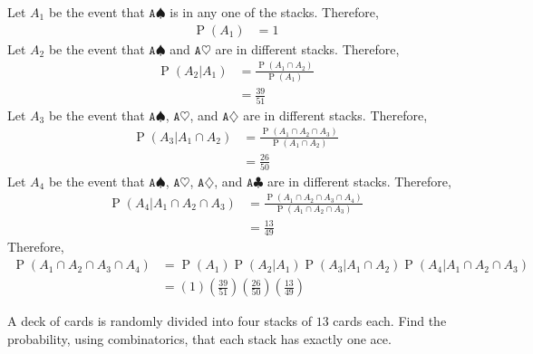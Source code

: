 \documentclass[titlepage, fleqn, a4paper, 12pt, twoside]{article}
\theoremstyle{definition}
\theoremstyle{theorem}
\DeclareMathOperator{\prob}{\mathrm{P}}
\begin{document}
\begin{solution}
	Let $A_1$ be the event that $\mathtt{A}\spadesuit$ is in any one of the stacks.
	Therefore,
	\begin{align*}
		\prob(A_1) & = 1
	\end{align*}
	Let $A_2$ be the event that $\mathtt{A}\spadesuit$ and $\mathtt{A}\heartsuit$ are in different stacks.
	Therefore,
	\begin{align*}
		\prob(A_2 | A_1) & = \frac{\prob(A_1 \cap A_2)}{\prob(A_1)} \\
                                 & = \frac{39}{51}
	\end{align*}
	Let $A_3$ be the event that $\mathtt{A}\spadesuit$, $\mathtt{A}\heartsuit$, and $\mathtt{A}\diamondsuit$ are in different stacks.
	Therefore,
	\begin{align*}
		\prob(A_3 | A_1 \cap A_2) & = \frac{\prob(A_1 \cap A_2 \cap A_3)}{\prob(A_1 \cap A_2)} \\
                                          & = \frac{26}{50}
	\end{align*}
	Let $A_4$ be the event that $\mathtt{A}\spadesuit$, $\mathtt{A}\heartsuit$, $\mathtt{A}\diamondsuit$, and $\mathtt{A}\clubsuit$ are in different stacks.
	Therefore,
	\begin{align*}
		\prob(A_4 | A_1 \cap A_2 \cap A_3) & = \frac{\prob(A_1 \cap A_2 \cap A_3 \cap A_4)}{\prob(A_1 \cap A_2 \cap A_3)} \\
                                                   & = \frac{13}{49}
	\end{align*}
	Therefore,
	\begin{align*}
		\prob(A_1 \cap A_2 \cap A_3 \cap A_4) & = \prob(A_1) \prob(A_2 | A_1) \prob(A_3 | A_1 \cap A_2) \prob(A_4 | A_1 \cap A_2 \cap A_3) \\
                                                      & = (1) \left( \frac{39}{51} \right) \left( \frac{26}{50} \right) \left( \frac{13}{49} \right)
	\end{align*}
\end{solution}

\begin{question}
	A deck of cards is randomly divided into four stacks of $13$ cards each.
	Find the probability, using combinatorics, that each stack has exactly one ace.
\end{question}
\end{document}
